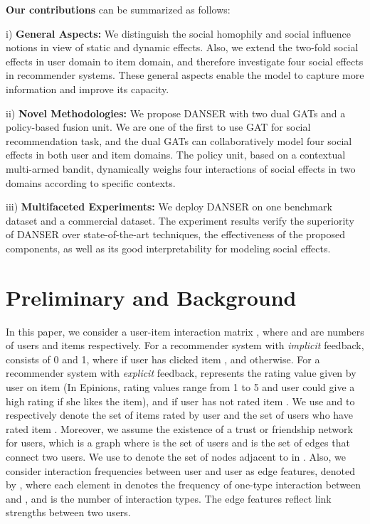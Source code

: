 \documentclass[sigconf]{acmart}
\begin{document}
\textbf{Our contributions} can be summarized as follows:

i) \textbf{General Aspects:} We distinguish the social homophily and social influence notions in view of static and dynamic effects. 
Also, we extend the two-fold social effects in user domain to item domain, and therefore investigate four social effects in recommender systems. 
These general aspects enable the model to capture more information and improve its capacity.

ii) \textbf{Novel Methodologies:} We propose DANSER with two dual GATs and a policy-based fusion unit. {We are one of the first to use GAT for social recommendation task}, and
the dual GATs can collaboratively model four social effects in both user and item domains. 
The policy unit, based on a contextual multi-armed bandit, dynamically weighs four interactions of social effects in two domains according to specific contexts. 



iii) \textbf{Multifaceted Experiments:} We deploy DANSER on one benchmark dataset and a commercial dataset. 
The experiment results verify the superiority of DANSER over state-of-the-art techniques, the effectiveness of the proposed components, as well as its good interpretability for modeling social effects.
\vspace{-5pt}
\section{Preliminary and Background}

In this paper, we consider a user-item interaction matrix , where  and  are numbers of users and items respectively. 
For a recommender system with \emph{implicit} feedback,  consists of 0 and 1, where  if user  has clicked item , and  otherwise. 
For a recommender system with \emph{explicit} feedback,  represents the rating value given by user  on item  (In Epinions, rating values range from 1 to 5 and user could give a high rating if she likes the item), and  if user  has not rated item . 
We use  and  to respectively denote the set of items rated by user  and the set of users who have rated item . 
Moreover, we assume the existence of a trust or friendship network for users, which is a graph  where  is the set of users and  is the set of edges that connect two users.
We use  to denote the set of nodes adjacent to  in .
Also, we consider interaction frequencies between user  and user  as edge features, denoted by , where each element in  denotes the frequency of one-type interaction between  and , and  is the number of interaction types. The edge features reflect link strengths between two users.
\end{document}
